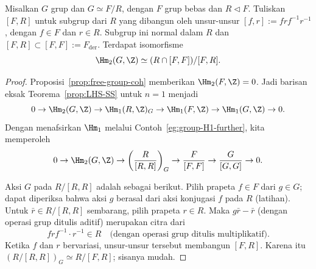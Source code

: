\begin{corollary}[H.\ Hopf]\label{prop:Hopf-H2}
	Misalkan $G$ grup dan $G\simeq F/R$, dengan $F$ grup bebas dan
	$R\lhd F$. Tuliskan $[F,R]$ untuk subgrup dari $R$ yang dibangun oleh
	unsur-unsur $[f,r]:=frf^{-1}r^{-1}$, dengan $f\in F$ dan $r\in R$.
	Subgrup ini normal dalam $R$ dan
	$[F,R]\subset[F,F]:=F_{\mathrm{der}}$. Terdapat isomorfisme
	\[ \Hm_2(G,\Z)\simeq(R\cap[F,F])/[F,R]. \]
\end{corollary}
\begin{proof}
	Proposisi~\ref{prop:free-group-coh} memberikan $\Hm_2(F,\Z)=0$. Jadi
	barisan eksak Teorema~\ref{prop:LHS-SS} untuk $n=1$ menjadi
	\[ 0\to\Hm_2(G,\Z)\to\Hm_1(R,\Z)_G
	\to\Hm_1(F,\Z)\to\Hm_1(G,\Z)\to0. \]
	Dengan menafsirkan $\Hm_1$ melalui Contoh~\ref{eg:group-H1-further}, kita
	memperoleh
	\[ 0\to\Hm_2(G,\Z)\to\left(\frac{R}{[R,R]}\right)_G
	\to\frac{F}{[F,F]}\to\frac{G}{[G,G]}\to0. \]

	Aksi $G$ pada $R/[R,R]$ adalah sebagai berikut. Pilih prapeta $f\in F$ dari
	$g\in G$; dapat diperiksa bahwa aksi $g$ berasal dari aksi konjugasi
	$f$ pada $R$ (latihan). Untuk $\bar r\in R/[R,R]$ sembarang, pilih prapeta
	$r\in R$. Maka $g\bar r-\bar r$ (dengan operasi grup ditulis aditif)
	merupakan citra dari
	\[ frf^{-1}\cdot r^{-1}\in R
	\quad\text{(dengan operasi grup ditulis multiplikatif)}. \]
	Ketika $f$ dan $r$ bervariasi, unsur-unsur tersebut membangun $[F,R]$.
	Karena itu $(R/[R,R])_G\simeq R/[F,R]$; sisanya mudah.
\end{proof}

